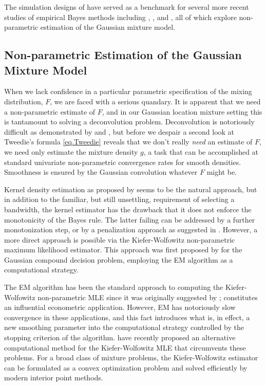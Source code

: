 \documentclass[12pt]{amsart}
\begin{document}
The simulation designs of  have served as a benchmark
for several more recent studies of empirical Bayes methods including
, , and  ,  all of which
explore non-parametric estimation of the Gaussian mixture model.

\subsection{Non-parametric Estimation of the Gaussian Mixture Model}
When we lack confidence in a particular parametric specification of
the mixing distribution, $F$, we are faced with a serious quandary.
It is apparent that we need a non-parametric estimate of $F$, and in
our Gaussian location mixture setting this is tantamount to solving
a deconvolution problem.  Deconvolution is notoriously difficult as demonstrated
by  and , but before we
despair a second look at Tweedie's formula \eqref{eq.Tweedie} reveals
that we don't really {\it need} an estimate of $F$, we need only estimate
the mixture density $g$, a task that can be accomplished at standard univariate
non-parametric convergence rates for smooth densities.  Smoothness is ensured
by the Gaussian convolution whatever $F$ might be.

Kernel density estimation as proposed by  seems to be the natural
approach, but in addition to the familiar, but still unsettling, requirement 
of selecting a bandwidth, the kernel estimator has the drawback that 
it does not enforce the monotonicity of the Bayes rule.  The
latter failing can be addressed by a further monotonization step, or by a
penalization approach as suggested in .  However, a more direct
approach is possible via the Kiefer-Wolfowitz non-parametric maximum likelihood
estimator.  This approach was first proposed by  for the
Gaussian compound decision problem, employing the EM algorithm as a computational
strategy. 

The EM algorithm has been the standard approach to computing the 
Kiefer-Wolfowitz non-parametric MLE since it was originally suggested by 
; 
constitutes an influential econometric application.  However, EM has notoriously slow
convergence in these applications, and this fact introduces what is, in effect, a
new smoothing parameter into the computational strategy controlled by the stopping
criterion of the algorithm.    have recently proposed an alternative
computational method for the Kiefer-Wolfowitz MLE that circumvents these problems.  For
a broad class of mixture problems, the Kiefer-Wolfowitz estimator can be formulated 
as a convex optimization problem and solved efficiently by modern interior point methods.  
\end{document}

